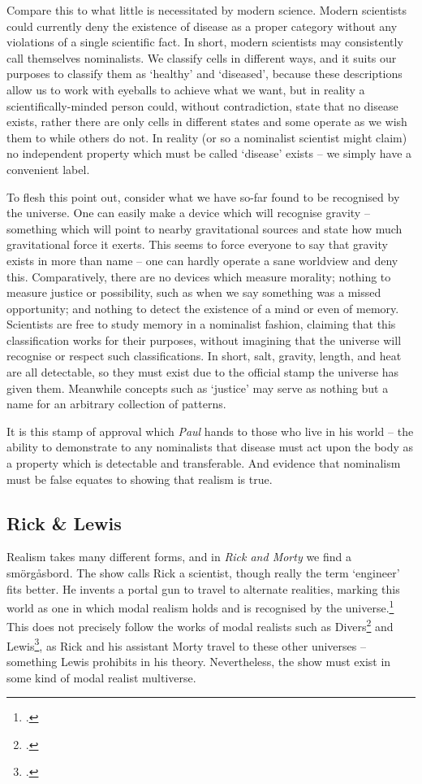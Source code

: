 \documentclass{article}
\begin{document}
Compare this to what little is necessitated by modern science. Modern scientists could currently deny the existence of disease as a proper category without any violations of a single scientific fact. In short, modern scientists may consistently call themselves nominalists. We classify cells in different ways, and it suits our purposes to classify them as `healthy' and `diseased', because these descriptions allow us to work with eyeballs to achieve what we want, but in reality a scientifically-minded person could, without contradiction, state that no disease exists, rather there are only cells in different states and some operate as we wish them to while others do not. In reality (or so a nominalist scientist might claim) no independent property which must be called `disease' exists -- we simply have a convenient label.

To flesh this point out, consider what we have so-far found to be recognised by the universe. One can easily make a device which will recognise gravity -- something which will point to nearby gravitational sources and state how much gravitational force it exerts. This seems to force everyone to say that gravity exists in more than name -- one can hardly operate a sane worldview and deny this. Comparatively, there are no devices which measure morality; nothing to measure justice or possibility, such as when we say something was a missed opportunity; and nothing to detect the existence of a mind or even of memory. Scientists are free to study memory in a nominalist fashion, claiming that this classification works for their purposes, without imagining that the universe will recognise or respect such classifications. In short, salt, gravity, length, and heat are all detectable, so they must exist due to the official stamp the universe has given them. Meanwhile concepts such as `justice' may serve as nothing but a name for an arbitrary collection of patterns.

It is this stamp of approval which \textit{Paul} hands to those who live in his world -- the ability to demonstrate to any nominalists that disease must act upon the body as a property which is detectable and transferable. And evidence that nominalism must be false equates to showing that realism is true.

\subsection{Rick \& Lewis}
Realism takes many different forms, and in \textit{Rick and Morty} we find a sm\"org{\aa}sbord. The show calls Rick a scientist, though really the term `engineer' fits better. He invents a portal gun to travel to alternate realities, marking this world as one in which modal realism holds and is recognised by the universe.\footcite[\textit{Close Rick-counters of the Rick Kind}, s. 1, e. 10]{ricknmorty} This does not precisely follow the works of modal realists such as Divers\footcite[p 217-18]{genuinerealisttheory} and Lewis\footcite[p 70]{pluralityworlds}, as Rick and his assistant Morty travel to these other universes -- something Lewis prohibits in his theory. Nevertheless, the show must exist in some kind of modal realist multiverse.
\end{document}
